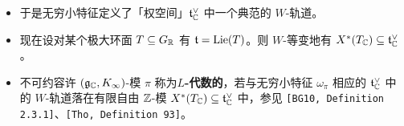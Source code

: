 \begin{itemize}
\[
\Hom_{\C\text{-}\mathrm{alg}}\bigl(U(\mathfrak t_\C),\C\bigr)\cong\Hom_{\C\text{-}\mathrm{lin}}\bigl(\mathfrak t_\C,\C\bigr)=:\mathfrak t_\C^\vee,
\]
且 $U(\mathfrak t_\C)^W\hookrightarrow U(\mathfrak t_\C)$ 是有限扩张。
\item 于是无穷小特征定义了「权空间」$\mathfrak t_{\mathbb{C}}^\vee$ 中一个典范的 $W$-轨道。
\item 现在设对某个极大环面 $T\subseteq G_{\mathbb{R}}$ 有 $\mathfrak t=\operatorname{Lie}(T)$。则 $W$-等变地有 $X^*(T_{\mathbb{C}})\subseteq\mathfrak t_{\mathbb{C}}^\vee$。
\item 不可约容许 $(\mathfrak{g}_{\mathbb{C}},K_\infty)$-模 $\pi$ 称为\textbf{$L$-代数的}，若与无穷小特征 $\omega_\pi$ 相应的 $\mathfrak t_{\mathbb{C}}^\vee$ 中的 $W$-轨道落在有限自由 $\mathbb{Z}$-模 $X^*(T_{\mathbb{C}})\subseteq\mathfrak t_{\mathbb{C}}^\vee$ 中，参见 \texttt{[BG10, Definition 2.3.1]}、\texttt{[Tho, Definition 93]}。
\end{itemize}

